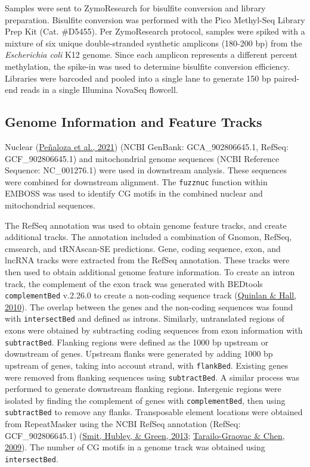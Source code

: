 \documentclass [11pt, proquest] {uwthesis}[2015/03/03]
\begin{document}
Samples were sent to ZymoResearch for bisulfite conversion and library preparation. Bisulfite conversion was performed with the Pico Methyl-Seq Library Prep Kit (Cat. \#D5455). Per ZymoResearch protocol, samples were spiked with a mixture of six unique double-stranded synthetic amplicons (180-200 bp) from the \emph{Escherichia coli} K12 genome. Since each amplicon represents a different percent methylation, the spike-in was used to determine bisulfite conversion efficiency. Libraries were barcoded and pooled into a single lane to generate 150 bp paired-end reads in a single Illumina NovaSeq flowcell.

\hypertarget{genome-information-and-feature-tracks-1}{%
\subsection{Genome Information and Feature Tracks}\label{genome-information-and-feature-tracks-1}}

Nuclear (\protect\hyperlink{ref-Penaloza2021}{Peñaloza et al., 2021}) (NCBI GenBank: GCA\_902806645.1, RefSeq: GCF\_902806645.1) and mitochondrial genome sequences (NCBI Reference Sequence: NC\_001276.1) were used in downstream analysis. These sequences were combined for downstream alignment. The \texttt{fuzznuc} function within EMBOSS was used to identify CG motifs in the combined nuclear and mitochondrial sequences.

The RefSeq annotation was used to obtain genome feature tracks, and create additional tracks. The annotation included a combination of Gnomon, RefSeq, cmsearch, and tRNAscan-SE predictions. Gene, coding sequence, exon, and lncRNA tracks were extracted from the RefSeq annotation. These tracks were then used to obtain additional genome feature information. To create an intron track, the complement of the exon track was generated with BEDtools \texttt{complementBed} v.2.26.0 to create a non-coding sequence track (\protect\hyperlink{ref-Quinlan2010}{Quinlan \& Hall, 2010}). The overlap between the genes and the non-coding sequences was found with \texttt{intersectBed} and defined as introns. Similarly, untranslated regions of exons were obtained by subtracting coding sequences from exon information with \texttt{subtractBed}. Flanking regions were defined as the 1000 bp upstream or downstream of genes. Upstream flanks were generated by adding 1000 bp upstream of genes, taking into account strand, with \texttt{flankBed}. Existing genes were removed from flanking sequences using \texttt{subtractBed}. A similar process was performed to generate downstream flanking regions. Intergenic regions were isolated by finding the complement of genes with \texttt{complementBed}, then using \texttt{subtractBed} to remove any flanks. Transposable element locations were obtained from RepeatMasker using the NCBI RefSeq annotation (RefSeq: GCF\_902806645.1) (\protect\hyperlink{ref-Smit2013}{Smit, Hubley, \& Green, 2013}; \protect\hyperlink{ref-Tarailo-Graovac2009}{Tarailo-Graovac \& Chen, 2009}). The number of CG motifs in a genome track was obtained using \texttt{intersectBed}.
\end{document}

